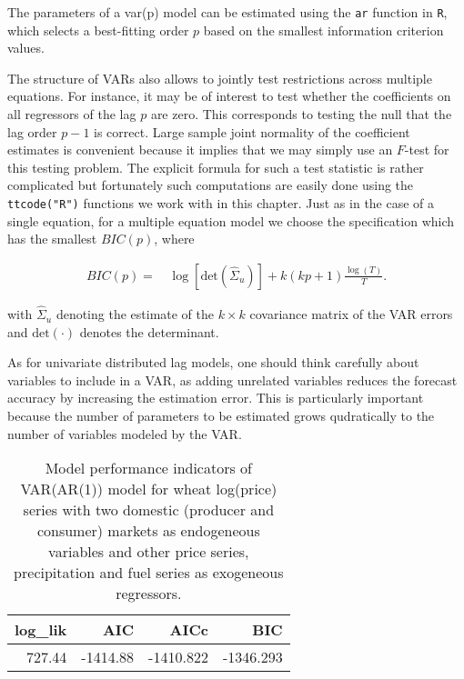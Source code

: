 \documentclass[
  12pt,
]{article}
\begin{document}
The parameters of a var(p) model can be estimated using the \texttt{ar} function in \texttt{R}, which selects a best-fitting order \(p\) based on the smallest information criterion values.

The structure of VARs also allows to jointly test restrictions across multiple equations. For instance, it may be of interest to test whether the coefficients on all regressors of the lag \(p\) are zero. This corresponds to testing the null that the lag order \(p-1\) is correct. Large sample joint normality of the coefficient estimates is convenient because it implies that we may simply use an \(F\)-test for this testing problem. The explicit formula for such a test statistic is rather complicated but fortunately such computations are easily done using the \texttt{ttcode("R")} functions we work with in this chapter. Just as in the case of a single equation, for a multiple equation model we choose the specification which has the smallest \(BIC(p)\), where

\[
\begin{aligned}
  BIC(p) =& \, \log\left[\text{det}(\widehat{\Sigma}_u)\right] + k(kp+1) \frac{\log(T)}{T}.
\end{aligned}
\]

with \(\widehat{\Sigma}_u\) denoting the estimate of the \(k \times k\) covariance matrix of the VAR errors and \(\text{det}(\cdot)\) denotes the determinant.

As for univariate distributed lag models, one should think carefully about variables to include in a VAR, as adding unrelated variables reduces the forecast accuracy by increasing the estimation error. This is particularly important because the number of parameters to be estimated grows qudratically to the number of variables modeled by the VAR.

\begin{longtable}[t]{rrrr}
\caption{\label{tab:retail-var-fit-tidy}Model performance indicators of VAR(AR(1)) model for wheat log(price) series with two domestic (producer and consumer) markets as endogeneous variables and other price series, precipitation and fuel series as exogeneous regressors.}\\
\toprule
log\_lik & AIC & AICc & BIC\\
\midrule
727.44 & -1414.88 & -1410.822 & -1346.293\\
\bottomrule
\end{longtable}
\end{document}
